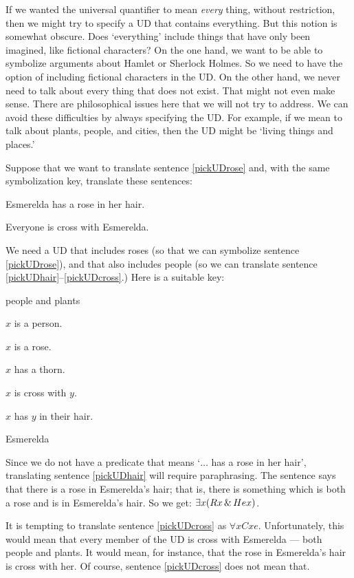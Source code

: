 If we wanted the universal quantifier to mean \emph{every} thing, without restriction, then we might try to specify a UD that contains everything. But this notion is somewhat obscure. Does `everything' include things that have only been imagined, like fictional characters? On the one hand, we want to be able to symbolize arguments about Hamlet or Sherlock Holmes. So we need to have the option of including fictional characters in the UD. On the other hand, we never need to talk about every thing that does not exist. That might not even make sense. There are philosophical issues here that we will not try to address. We can avoid these difficulties by always specifying the UD. For example, if we mean to talk about plants, people, and cities, then the UD might be `living things and places.'

Suppose that we want to translate sentence \ref{pickUDrose} and, with the same symbolization key, translate these sentences:

\begin{earg}
\item[\ex{pickUDhair}] Esmerelda has a rose in her hair.
\item[\ex{pickUDcross}] Everyone is cross with Esmerelda.
\end{earg}

We need a UD that includes roses (so that we can symbolize sentence \ref{pickUDrose}), and that also includes people (so we can translate sentence \ref{pickUDhair}--\ref{pickUDcross}.) Here is a suitable key:
\begin{ekey}
\item[UD:] people and plants
\item[Px:] $x$ is a person.
\item[Rx:] $x$ is a rose.
\item[Tx:] $x$ has a thorn.
\item[Cxy:] $x$ is cross with $y$.
\item[Hxy:] $x$ has $y$ in their hair.
\item[e:] Esmerelda
\end{ekey}

Since we do not have a predicate that means `$\ldots$ has a rose in her hair', translating sentence \ref{pickUDhair} will require paraphrasing. The sentence says that there is a rose in Esmerelda's hair; that is, there is something which is both a rose and is in Esmerelda's hair. So we get: $\exists x(Rx \,\&\, Hex)$.

It is tempting to translate sentence \ref{pickUDcross} as $\forall x Cxe$. Unfortunately, this would mean that every member of the UD is cross with Esmerelda --- both people and plants. It would mean, for instance, that the rose in Esmerelda's hair is cross with her. Of course, sentence \ref{pickUDcross} does not mean that.

